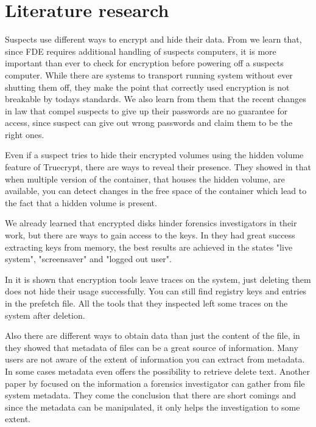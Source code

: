 \section{Literature research}

Suspects use different ways to encrypt and hide their data. From \cite{Casey2011129} we learn that, since \gls{FDE} requires additional handling of suspects computers, it is more important than ever to check for encryption before powering off a suspects computer. While there are systems to transport running system without ever shutting them off, they make the point that correctly used encryption is not breakable by todays standards.  We also learn from them that the recent changes in law that compel suspects to give up their passwords are no guarantee for access, since suspect can give out wrong passwords and claim them to be the right ones. 

Even if a suspect tries to hide their encrypted volumes using the hidden volume feature of Truecrypt, there are ways to reveal their presence.  They showed in \cite{Hargreaves2010} that when multiple version of the container, that houses the hidden volume, are available, you can detect changes in the free space of the container which lead to the fact that a hidden volume is present.

We already learned that encrypted disks hinder forensics investigators in their work, but there are ways to gain access to the keys. In \cite{MaartmannMoe2009S132} they had great success extracting keys from memory, the best results are achieved in the states "live system", "screensaver" and "logged out user".

In \cite{5563320} it is shown that encryption tools leave traces on the system, just deleting them does not hide their usage successfully. You can still find registry keys and entries in the prefetch file. All the tools that they inspected left some traces on the system after deletion.

Also there are different ways to obtain data than just the content of the file, in \cite{Castiglione2007750} they showed that metadata of files can be a great source of information. Many users are not aware of the extent of information you can extract from metadata. In some cases metadata even offers the possibility to retrieve delete text. Another paper by \cite{Buchholz2004298} focused on the information a forensics investigator can gather from file system metadata. They come the conclusion that there are short comings and since the metadata can be manipulated, it only helps the investigation to some extent.

